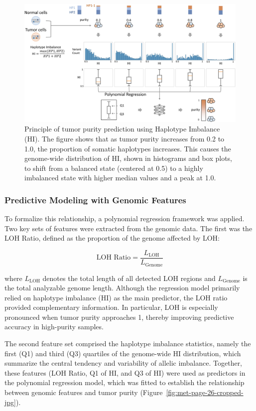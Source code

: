 \documentclass[pdflatex,sn-nature]{sn-jnl}
\def\pandocbounded#1{%
  \begingroup
  \setkeys{Gin}{width=1.0\linewidth,height=1.0\textheight,keepaspectratio}%
  #1%
  \endgroup
}
\begin{document}
\begin{figure}
\centering
\pandocbounded{\includegraphics[keepaspectratio]{page_25_cropped.jpg}}
\caption[Haplotype Imbalance Principle]{Principle of tumor purity prediction using Haplotype Imbalance (HI). The figure shows that as tumor purity increases from 0.2 to 1.0, the proportion of somatic haplotypes increases. This causes the genome-wide distribution of HI, shown in histograms and box plots, to shift from a balanced state (centered at 0.5) to a highly imbalanced state with higher median values and a peak at 1.0.}\label{fig:met-page-25-cropped-jpg}
\end{figure}

\subsubsection{Predictive Modeling with Genomic Features}\label{predictive-modeling-with-genomic-features}

To formalize this relationship, a polynomial regression framework was applied. Two key sets of features were extracted from the genomic data. The first was the LOH Ratio, defined as the proportion of the genome affected by LOH:

$$
\text{LOH Ratio} = \frac{L_{\text{LOH}}}{L_{\text{Genome}}}
$$

where \(L_{\text{LOH}}\) denotes the total length of all detected LOH regions and \(L_{\text{Genome}}\) is the total analyzable genome length. Although the regression model primarily relied on haplotype imbalance (HI) as the main predictor, the LOH ratio provided complementary information. In particular, LOH is especially pronounced when tumor purity approaches 1, thereby improving predictive accuracy in high-purity samples.

The second feature set comprised the haplotype imbalance statistics, namely the first (Q1) and third (Q3) quartiles of the genome-wide HI distribution, which summarize the central tendency and variability of allelic imbalance. Together, these features (LOH Ratio, Q1 of HI, and Q3 of HI) were used as predictors in the polynomial regression model, which was fitted to establish the relationship between genomic features and tumor purity (Figure~\ref{fig:met-page-26-cropped-jpg}).
\end{document}
